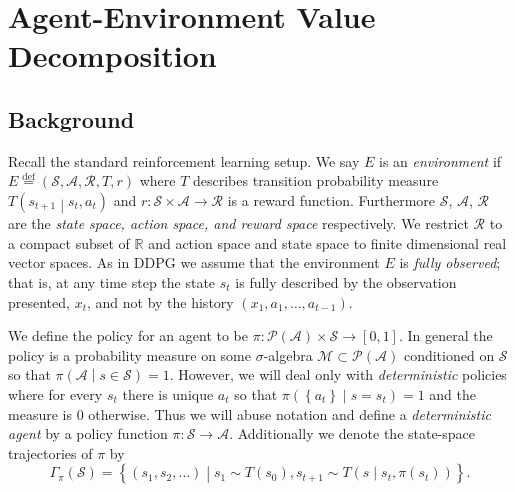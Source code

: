 \documentclass{article} %
\numberwithin{equation}{subsection}
\numberwithin{theorem}{subsection}
\newcommand{\set}[1]{ \left\{ #1 \right\} }
\def\suchthat{\mathrel{}\middle|\mathrel{}}
\def\defeq{\stackrel{\text{def}}{=}}
\def\scriptm{{\mathcal M}}
\def\scripta{{\mathcal A}}
\def\scriptr{{\mathcal R}}
\def\scriptp{{\mathcal P}}
\def\scripts{{\mathcal S}}
\begin{document}

\section{Agent-Environment Value Decomposition}


\subsection{Background}
Recall the standard reinforcement learning setup. We say $E$ is an \emph{environment} if $E \defeq (\scripts, \scripta, \scriptr, T, r)$ where $T$ describes transition probability measure $T\left(s_{t+1}\suchthat s_t, a_t\right)$ and $r: \scripts \times \scripta \to \scriptr$ is a reward function. Furthermore $\scripts$, $\scripta$, $\scriptr$ are the \emph{state space, action space, and reward space} respectively. We restrict $\scriptr$ to a compact subset of $\mathbb{R}$ and action space and state space to finite dimensional real vector spaces. As in DDPG we assume that the environment $E$ is \emph{fully observed}; that is, at any time step the state $s_t$ is fully described by the observation presented, $x_t$, and not by the history $(x_1, a_1, \dots, a_{t-1}).$

We define the policy for an agent to be $\pi: \scriptp(\scripta) \times \scripts \to [0,1]$. In general the policy is a probability measure on some $\sigma$-algebra $\scriptm \subset \scriptp(\scripta)$ conditioned on $\scripts$ so that $\pi\left(\scripta \suchthat s \in \scripts\right) = 1$. However, we will deal only with \emph{deterministic} policies where for every $s_t$ there is unique $a_t$ so that $\pi\left(\set{a_t} \suchthat s = s_t\right) = 1$ and the measure is $0$ otherwise. Thus we will abuse notation and define a \emph{deterministic agent} by a policy function $\pi: \scripts \to \scripta$. Additionally we denote the state-space trajectories of $\pi $ by
\begin{equation}
 	\Gamma_\pi(\scripts) = \set{(s_1, s_2, \dots)\suchthat s_1 \sim T(s_0), s_{t+1} \sim T\left(s \suchthat s_t, \pi(s_t)\right)}.
 \end{equation}
\end{document}
